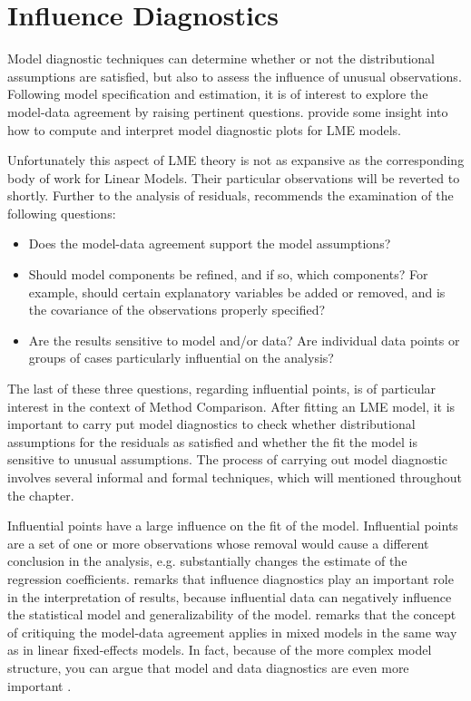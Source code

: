 \documentclass[12pt, a4paper]{report}
\theoremstyle{definition}
\theoremstyle{remark}
\begin{document}
\section{Influence Diagnostics}
Model diagnostic techniques can determine whether or not the distributional assumptions are satisfied, but also to assess the influence of unusual observations. Following model specification and estimation, it is of interest to explore the model-data agreement by raising pertinent questions. \citet{pb} provide some insight into how to compute and interpret model diagnostic plots for LME models. 

Unfortunately this aspect of LME theory is not as expansive as the corresponding body of work for Linear Models. Their particular observations will be reverted to shortly. Further to the analysis of residuals, \citet{schabenberger} recommends the examination of the following questions:
\begin{itemize}
\item Does the model-data agreement support the model assumptions?
\item Should model components be refined, and if so, which components? For example, should certain explanatory variables
be added or removed, and is the covariance of the observations properly specified?
\item Are the results sensitive to model and/or data? Are individual data points or groups of cases particularly
influential on the analysis?
\end{itemize}

The last of these three questions, regarding influential points, is of particular interest in the context of Method Comparison. After fitting an LME model, it is important to carry put model diagnostics to check whether distributional assumptions for the residuals as satisfied and whether the fit the model is sensitive to unusual assumptions. The process of carrying out model
diagnostic involves several informal and formal techniques, which will mentioned throughout the chapter.

Influential points have a large influence on the fit of the model. Influential points are a set of one or more observations whose removal would cause a different conclusion in the analysis, e.g. substantially changes the estimate of the regression coefficients. \citet{west} remarks that influence diagnostics play an important role in the interpretation of results, because influential data can negatively influence the statistical model and generalizability of the model. \citet{schabenberger} remarks that the concept of critiquing the model-data agreement applies in mixed models in the same way as in linear
fixed-effects models. In fact, because of the more complex model structure, you can argue that model and
data diagnostics are even more important \citep{west}.
\end{document}
